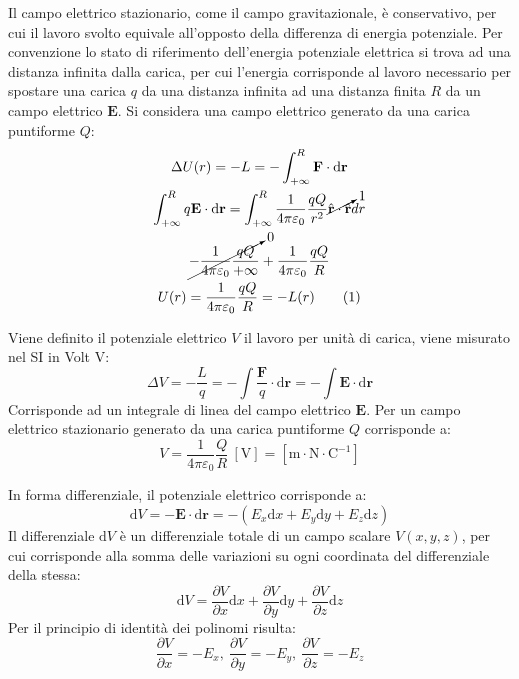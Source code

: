 \documentclass{article}
\newcommand{\vect}[1]{\boldsymbol{\mathbf{#1}}}
\newcommand{\df}{\mathrm{d}}
\newcommand{\tageq}{\tag{\stepcounter{equation}\theequation}}
\newcommand{\SI}[1]{\mathrm{#1}}
\numberwithin{equation}{subsection}
\begin{document}
Il campo elettrico stazionario, come il campo gravitazionale, è conservativo, per cui il lavoro svolto equivale all'opposto della differenza di energia potenziale. Per 
convenzione lo stato di riferimento dell'energia potenziale elettrica si trova ad una distanza infinita dalla carica, per cui l'energia corrisponde al lavoro necessario per 
spostare una carica $q$ da una distanza infinita ad una distanza finita $R$ da un campo elettrico $\vect{E}$. Si considera una campo elettrico generato da una carica puntiforme 
$Q$:
\begin{gather*}
    \Delta U(r)=-L=-\displaystyle\int_{+\infty}^R\vect{F}\cdot \df\vect{r}\\
    \displaystyle\int_{+\infty}^Rq\vect{E}\cdot \df\vect{r}=\int_{+\infty}^R\frac{1}{4\pi\varepsilon_0}\frac{qQ}{r^2}\cancelto{1}{\hat{\vect{r}}\cdot \hat{\vect{r}}}dr\\
    \cancelto{0}{-\displaystyle\frac{1}{4\pi\varepsilon_0}\frac{qQ}{+\infty}}+\frac{1}{4\pi\varepsilon_0}\frac{qQ}{R}\\
    U(r)=\frac{1}{4\pi\varepsilon_0}\frac{qQ}{R}=-L(r)\tageq
\end{gather*}


Viene definito il potenziale elettrico $V$ il lavoro per unità di carica, viene misurato nel SI in Volt V:
\begin{equation}
    \Delta V=\displaystyle-\frac{L}{q}=-\int\frac{\vect{F}}{q}\cdot \df\vect{r}=-\int\vect{E}\cdot \df\vect{r}
\end{equation}
Corrisponde ad un integrale di linea del campo elettrico $\vect{E}$. 
Per un campo elettrico stazionario generato da una carica puntiforme $Q$ corrisponde a:
\begin{equation}
    V=\displaystyle\frac{1}{4\pi\varepsilon_0}\frac{Q}{R}\:\left[\SI{V}\right]=\left[{\SI{m}\cdot\SI{N}}\cdot\SI{C}^{-1}\right]
\end{equation}

In forma differenziale, il potenziale elettrico corrisponde a:
\begin{equation*}
    \df V=-\vect{E}\cdot \df\vect{r}=-(E_x\df x+E_y\df y+E_z\df z)
\end{equation*}
Il differenziale $\df V$ è un differenziale totale di un campo scalare $V(x,y,z)$, per cui corrisponde alla somma delle variazioni su ogni coordinata del differenziale della stessa: 
\begin{equation*}
    \df V=\displaystyle\frac{\partial V}{\partial x}\df  x+\frac{\partial V}{\partial y}\df  y+\frac{\partial V}{\partial z}\df  z
\end{equation*}
Per il principio di identità dei polinomi risulta:
\begin{equation*}
    \displaystyle\frac{\partial V}{\partial x}=-E_x,\:\frac{\partial V}{\partial y}=-E_y,\:\frac{\partial V}{\partial z}=-E_z
\end{equation*}
\end{document}
